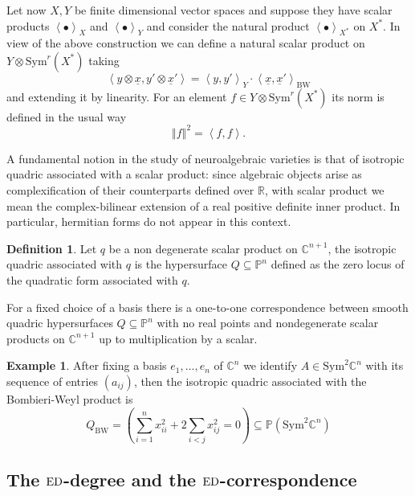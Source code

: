 \documentclass[11pt]{article}
\numberwithin{equation}{section}
\numberwithin{figure}{section}
\theoremstyle{plain}
\theoremstyle{definition}
\newtheorem{defn}[thm]{Definition}
\newtheorem{example}[thm]{Example}
\theoremstyle{remark}
\newcommand{\ot}{\otimes}
\newcommand{\su}{\subseteq}
\newcommand{\R}{\mathbb{R}}
\newcommand{\C}{\mathbb{C}}
\renewcommand{\P}{\mathbb{P}}
\newcommand{\Sym}{\mathrm{Sym}}
\newcommand{\BW}{\mathrm{BW}}
\newcommand{\ED}{\mathrm{ED}}
\begin{document}
Let now $X,Y$ be finite dimensional vector spaces and suppose they have
scalar products
$\left\langle \bullet \right\rangle_{X}$ and
$\left\langle \bullet \right\rangle_{Y}$ and consider the natural
product
$\left\langle \bullet \right\rangle_{X^{\ast}}$ on $X^{\ast}$.
In view of the above construction we can define a natural scalar product
on
$Y\ot \mathrm{Sym}^{r}\left( X^{\ast} \right)$
taking
\[
\left\langle
y\ot\underline{x},
y'\ot\underline{x}'
\right\rangle
=
\left\langle y,y' \right\rangle_{Y}
\cdot
\left\langle \underline{x},\underline{x}' \right\rangle_{\mathrm{BW}}
\]
and extending it by linearity. For an element
$f\in Y\ot \mathrm{Sym}^{r}\left( X^{\ast} \right)$
its norm is defined in the usual way
\[
\left\Vert f \right\Vert^{2}
=
\left\langle f,f \right\rangle.
\]

A fundamental notion in the study of neuroalgebraic varieties is that of isotropic quadric associated with a scalar product: since algebraic objects arise as complexification of their counterparts defined over $\R$, with scalar product we mean the complex-bilinear extension of a real positive definite inner product. In particular, hermitian forms do not appear in this context.
\begin{defn}
    Let $q$ be a non degenerate scalar product on $\C^{n+1}$, the isotropic quadric associated with $q$ is the hypersurface $Q\su\P^n$ defined as the zero locus of the quadratic form associated with $q$.
\end{defn}

For a fixed choice of a basis there is a one-to-one correspondence between smooth quadric hypersurfaces $Q\su\P^n$ with no real points and nondegenerate scalar products on $\C^{n+1}$ up to multiplication by a scalar.

\begin{example}\label{exa:BombieriWeyl}
    After fixing a basis $e_1,\dots, e_n$ of $\C^n$ we identify $A\in\Sym^2 \C^n$ with its sequence of entries $\left(a_{ij}\right)$, then the isotropic quadric associated with the Bombieri-Weyl product is
    \[
    Q_\BW=\left( \sum_{i=1} ^{n} x_{ii} ^2 + 2\sum_{i<j}x_{ij}^2 =0 \right)\su\P\left( \Sym^2 \C^n\right)
    \]
\end{example}

\subsection{The $\protect\ED$-degree and the $\protect\ED$-correspondence}\label{sec:EDGeneral}
\end{document}
